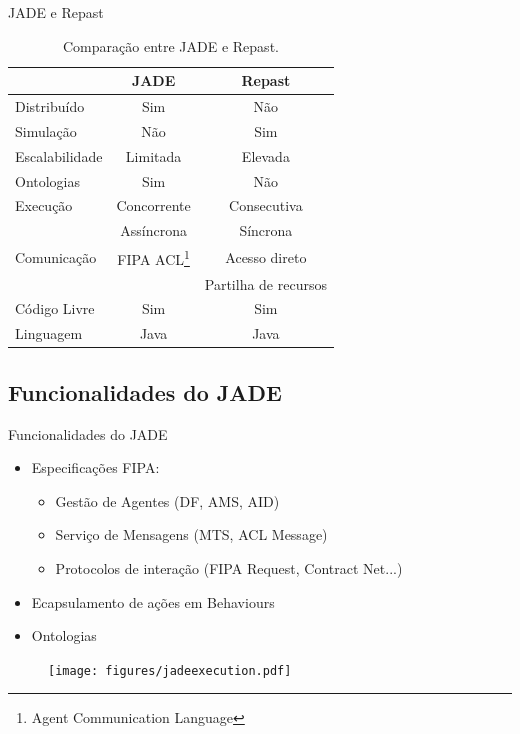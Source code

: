 \begin{frame}{JADE e Repast}
	\begin{table}[h]
		\label{tab:jadevsrep}
		\caption{Comparação entre JADE e Repast.}
		\small
		\begin{center}
			\begin{tabular}{l|cc}
			\hline

			\hline
			\textbf{} & \textbf{JADE} & \textbf{Repast} \\ %
			\hline
				Distribuído & Sim & Não \\ 
			\hline
				Simulação & Não & Sim \\ 
			\hline
				Escalabilidade & Limitada & Elevada \\ 
			\hline
				Ontologias & Sim & Não \\
			\hline
				Execução	& Concorrente	& Consecutiva  	\\
							& Assíncrona	& Síncrona 	\\
			\hline
				Comunicação & FIPA ACL\footnote{ Agent Communication Language} &  Acesso direto  \\ %
							  &			 &  Partilha de recursos \\
			\hline
				Código Livre & Sim & Sim \\ 
			\hline
				Linguagem & Java & Java \\ 
			\hline
			\end{tabular}
		\end{center}
	\end{table}
\end{frame}

\subsection{Funcionalidades do JADE}
\begin{frame}{Funcionalidades do JADE}
	\begin{itemize}
		\item Especificações FIPA:
		\begin{itemize}
			\item Gestão de Agentes (DF, AMS, AID)
			\item Serviço de Mensagens (MTS, ACL Message)
			\item Protocolos de interação (FIPA Request, Contract Net...)
		\end{itemize}
		\item Ecapsulamento de ações em Behaviours
		\item Ontologias
	\end{itemize}

	\begin{figure}[h]
		\centering
		\texttt{[image: figures/jadeexecution.pdf]}
		\label{fig:jade_fluxogram}
	\end{figure}
\end{frame}


